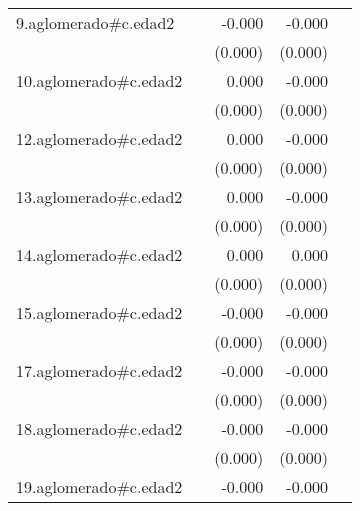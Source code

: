 {\begin{longtable}{l*{4}{D{.}{.}{-1}}}
\addlinespace
9.aglomerado#c.edad2&                     &      -0.000         &      -0.000\sym{*}  &                     \\
            &                     &     (0.000)         &     (0.000)         &                     \\
\addlinespace
10.aglomerado#c.edad2&                     &       0.000         &      -0.000         &                     \\
            &                     &     (0.000)         &     (0.000)         &                     \\
\addlinespace
12.aglomerado#c.edad2&                     &       0.000         &      -0.000         &                     \\
            &                     &     (0.000)         &     (0.000)         &                     \\
\addlinespace
13.aglomerado#c.edad2&                     &       0.000         &      -0.000         &                     \\
            &                     &     (0.000)         &     (0.000)         &                     \\
\addlinespace
14.aglomerado#c.edad2&                     &       0.000         &       0.000         &                     \\
            &                     &     (0.000)         &     (0.000)         &                     \\
\addlinespace
15.aglomerado#c.edad2&                     &      -0.000\sym{*}  &      -0.000         &                     \\
            &                     &     (0.000)         &     (0.000)         &                     \\
\addlinespace
17.aglomerado#c.edad2&                     &      -0.000         &      -0.000         &                     \\
            &                     &     (0.000)         &     (0.000)         &                     \\
\addlinespace
18.aglomerado#c.edad2&                     &      -0.000         &      -0.000\sym{**} &                     \\
            &                     &     (0.000)         &     (0.000)         &                     \\
\addlinespace
19.aglomerado#c.edad2&                     &      -0.000         &      -0.000         &                     \\

\end{longtable}}
